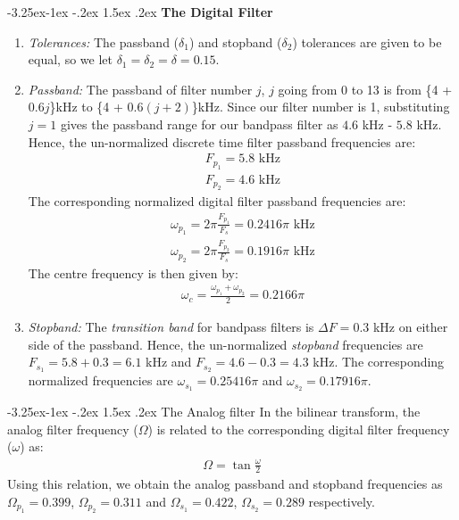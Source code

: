 \documentclass[article]{IEEEtran}
\makeatletter
\theoremstyle{remark}
\numberwithin{equation}{subsection}
\renewcommand\subsection{\@startsection{subsection}{2}{\z@}%
    {-3.25ex\@plus -1ex \@minus -.2ex}%
    {1.5ex \@plus .2ex}%
    {\normalfont\large\bfseries}}
\makeatother
\begin{document}
\subsection{\textbf{The Digital Filter}}\label{sec:dig_filt}
\begin{enumerate}[label = \roman*)]
    \item \textit{Tolerances:} The passband ($\delta_1$) and stopband ($\delta_2$) tolerances are given to be equal, so we let $\delta_1 = \delta_2 = \delta = 0.15$.
    
    \item \textit{Passband:} The passband of filter number $j$, $j$ going from 0 to 13 is from \{4 + 0.6$j$\}kHz to \{4 + 0.6$(j + 2)$\}kHz. Since our filter number is 1, substituting $j = 1$ gives the passband range for our bandpass filter as $4.6$ kHz - $5.8$ kHz. Hence, the un-normalized discrete time filter passband frequencies are:
    \begin{align}
        F_{p_1} = 5.8 \text{ kHz}\\
        F_{p_2} = 4.6 \text{ kHz}
    \end{align} The corresponding normalized digital filter passband frequencies are:
    \begin{align}
        \omega_{p_1} = 2\pi\frac{F_{p_1}}{F_s}  = 0.2416\pi\text{ kHz}\\
        \omega_{p_2} = 2\pi\frac{F_{p_2}}{F_s}  = 0.1916 \pi \text{ kHz}
    \end{align} The centre frequency is then given by:
    \begin{align}
        \omega_c = \frac{\omega_{p_1} + \omega_{p_2}}{2} = 0.2166\pi
    \end{align}  
    
    \item \textit{Stopband:} The \textit{transition band} for bandpass filters is $\Delta F = 0.3$ kHz on either side of the passband. Hence, the un-normalized \textit{stopband} frequencies are $F_{s_1} = 5.8 + 0.3 = 6.1$ kHz and $F_{s_2} = 4.6 - 0.3 = 4.3$ kHz. The corresponding normalized frequencies are $\omega_{s_1} = 0.25416 \pi$ and $\omega_{s_2} = 0.17916 \pi$.
\end{enumerate}
\subsection{The Analog filter}
In the bilinear transform, the analog filter frequency ($\Omega$) is related to the corresponding digital filter frequency ($\omega$) as:
\begin{align}
    \Omega = \tan \frac{\omega}{2}
\end{align} Using this relation, we obtain the analog passband and stopband frequencies as $\Omega_{p_1} = 0.399$, $\Omega_{p_2} = 0.311$ and $\Omega_{s_1} = 0.422$, $\Omega_{s_2} = 0.289$
respectively.
\end{document}
